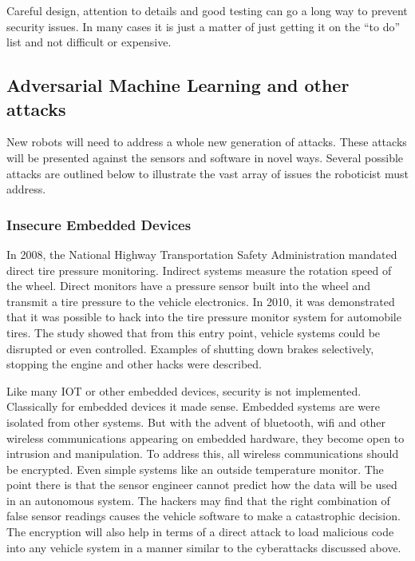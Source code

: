 Careful design, attention to details and good testing can go a long way
to prevent security issues. In many cases it is just a matter of just
getting it on the ``to do'' list and not difficult or expensive.

\hypertarget{adversarial-machine-learning-and-other-attacks}{%
\subsection{Adversarial Machine Learning and other
attacks}\label{adversarial-machine-learning-and-other-attacks}}

New robots will need to address a whole new generation of attacks. These
attacks will be presented against the sensors and software in novel
ways. Several possible attacks are outlined below to illustrate the vast
array of issues the roboticist must address.

\hypertarget{insecure-embedded-devices}{%
\subsubsection{Insecure Embedded
Devices}\label{insecure-embedded-devices}}

In 2008, the National Highway Transportation Safety Administration
mandated direct tire pressure monitoring. Indirect systems measure the
rotation speed of the wheel. Direct monitors have a pressure sensor
built into the wheel and transmit a tire pressure to the vehicle
electronics. In 2010, it was demonstrated that it was possible to hack
into the tire pressure monitor system for automobile tires. The study
showed that from this entry point, vehicle systems could be disrupted or
even controlled. Examples of shutting down brakes selectively, stopping
the engine and other hacks were described.

Like many IOT or other embedded devices, security is not implemented.
Classically for embedded devices it made sense. Embedded systems are
were isolated from other systems. But with the advent of bluetooth, wifi
and other wireless communications appearing on embedded hardware, they
become open to intrusion and manipulation. To address this, all wireless
communications should be encrypted. Even simple systems like an outside
temperature monitor. The point there is that the sensor engineer cannot
predict how the data will be used in an autonomous system. The hackers
may find that the right combination of false sensor readings causes the
vehicle software to make a catastrophic decision. The encryption will
also help in terms of a direct attack to load malicious code into any
vehicle system in a manner similar to the cyberattacks discussed above.


